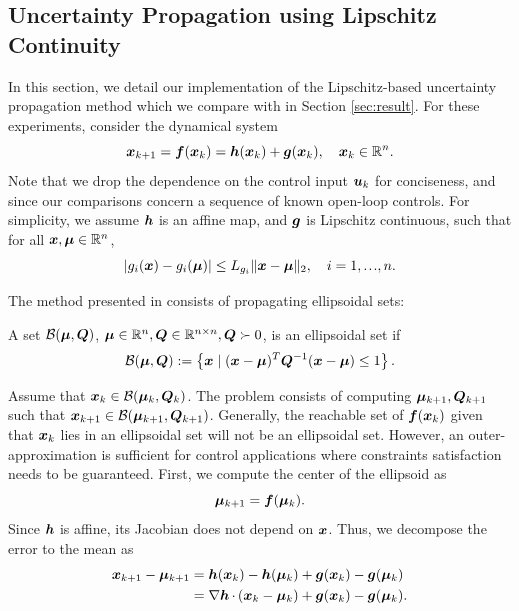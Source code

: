 \documentclass{article}
\begin{document}
\subsection{Uncertainty Propagation using Lipschitz Continuity}\label{sec:lipschitz_derivations}

In this section, we detail our implementation of the Lipschitz-based uncertainty propagation method which we compare with in Section \ref{sec:result}. 
For these experiments, consider the dynamical system
\begin{equation}
\bm{x}_{k+1} = \bm{f}(\bm{x}_k) 
= \bm{h}(\bm{x}_k) + \bm{g}(\bm{x}_k), \quad \bm{x}_k\in\mathbb{R}^n.
\end{equation}
Note that we drop the dependence on the control input $\bm{u}_k$ for conciseness, and since our comparisons concern a sequence of known open-loop controls. 
For simplicity, we assume $\bm{h}$ is an affine map, and $\bm{g}$ is Lipschitz continuous, such that for all $\bm{x},\boldsymbol\mu\in\mathbb{R}^n$,
\begin{equation}
|g_i(\x)-g_i(\bmu)| \leq L_{g_i} \|\x-\bmu \|_2, \quad i=1,\mydots,n.
\end{equation}

The method presented in \citep{koller2018} consists of propagating ellipsoidal sets:
\begin{mydef}\label{def:ellipsoidal_conf_region}
	A set $\mathcal{B}(\boldsymbol\mu, \bm{Q})$, $\boldsymbol\mu\in\mathbb{R}^n,\bm{Q}\in\mathbb{R}^{n\times n}, \bm{Q}\succ 0$, is an ellipsoidal set if 
	\begin{equation}
	    \mathcal{B}(\boldsymbol\mu , \bm{Q}) := \left\{ 
		\bm{x} \mid (\bm{x}-\boldsymbol\mu)^T \bm{Q}^{-1} (\bm{x}-\boldsymbol\mu) \leq 1
		\right\}.
	\end{equation}
\end{mydef}

Assume that $\bm{x}_k\in\mathcal{B}(\boldsymbol\mu_k,\bm{Q}_k)$. 
The problem consists of computing $\boldsymbol\mu_{k+1}, \bm{Q}_{k+1}$ such that $\bm{x}_{k+1}\in\mathcal{B}(\boldsymbol\mu_{k+1},\bm{Q}_{k+1})$. Generally, the reachable set of $\bm{f}(\bm{x}_k)$ given that $\bm{x}_k$ lies in an ellipsoidal set will not be an ellipsoidal set. However, an outer-approximation is sufficient for control applications where constraints satisfaction needs to be guaranteed. First, we compute the center of the ellipsoid as 
\begin{equation}
    \boldsymbol\mu_{k+1} = \bm{f}(\boldsymbol\mu_k).
\end{equation}
Since $\bm{h}$ is affine, its Jacobian does not depend on $\bm{x}$. Thus, we decompose the error to the mean as 
\begin{align*}
\bm{x}_{k+1}-\boldsymbol\mu_{k+1} &= \bm{h}(\bm{x}_k)-\bm{h}(\boldsymbol\mu_k)+\bm{g}(\bm{x}_k)-\bm{g}(\boldsymbol\mu_k)
\\
&= 
\nabla \bm{h} \,{\cdot}\, (\bm{x}_k-\boldsymbol\mu_k)+\bm{g}(\bm{x}_k)-\bm{g}(\boldsymbol\mu_k).
\end{align*}
\end{document}

